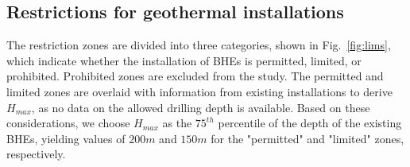 \subsection{Restrictions for geothermal installations}

The restriction zones are divided into three categories, shown in Fig.~\ref{fig:lims}, which indicate whether the installation of BHEs is permitted, limited, or prohibited.
Prohibited zones are excluded from the study. 
The permitted and limited zones are overlaid with information from existing installations to derive $H_{max}$, as no data on the allowed drilling depth is available.
Based on these considerations,
we choose $H_{max}$ as the $75^{th}$ percentile of the depth of the existing BHEs, yielding values of $200m$ and $150m$ for the "permitted" and "limited" zones, respectively. 
